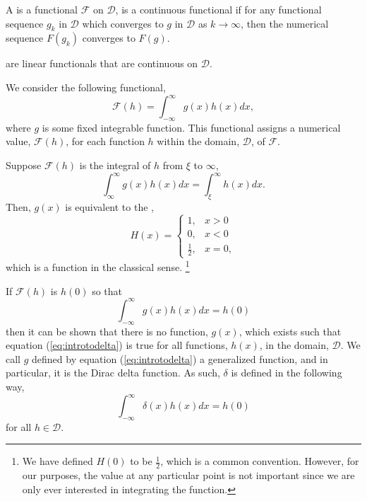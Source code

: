 \begin{definition}
    A  is a functional \(\mathcal{F}\) on \(\mathcal{D}\), is a continuous functional if for any functional sequence \(g_k\) in \(\mathcal{D}\) which converges to \(g\) in \(\mathcal{D}\) as \(k \to \infty\), then the numerical sequence \(F(g_k)\) converges to \(F(g)\).
\end{definition}

\begin{definition}
     are linear functionals that are continuous on \(\mathcal{D}\).
\end{definition}

We consider the following functional,
\begin{equation}\label{eq:generalizedFunction}
    \mathcal{F}(h) = \int_{-\infty}^{\infty} g(x)h(x)dx,
\end{equation}
where \(g\) is some fixed integrable function. This functional assigns a numerical value, \(\mathcal{F}(h)\), for each function \(h\) within the domain, \(\mathcal{D}\), of \(\mathcal{F}\).

\begin{example}
    Suppose \(\mathcal{F}(h)\) is the integral of \(h\) from \(\xi\) to \(\infty\),
    \begin{equation}
        \int_{\infty}^{\infty} g(x)h(x)dx = \int_{\xi}^{\infty} h(x) dx.
    \end{equation}
    Then, \(g(x)\) is equivalent to the ,
    \begin{equation}
        H(x) = \begin{cases}
            1, & x>0\\
            0, & x<0\\
            \frac{1}{2}, & x=0,
        \end{cases}
    \end{equation}
    which is a function in the classical sense. \footnote{We have defined \(H(0)\) to be \(\frac{1}{2}\), which is a common convention. However, for our purposes, the value at any particular point is not important since we are only ever interested in integrating the function.}    
\end{example}

If \(\mathcal{F}(h)\) is \(h(0)\) so that
\begin{equation}\label{eq:introtodelta}
    \int_{-\infty}^{\infty}g(x)h(x) dx=h(0)
\end{equation}
then it can be shown that there is no function, \(g(x)\), which exists such that equation (\ref{eq:introtodelta}) is true for all functions, \(h(x)\), in the domain, \(\mathcal{D}\). We call \(g\) defined by equation (\ref{eq:introtodelta}) a generalized function, and in particular, it is the Dirac delta function. As such, \(\delta\) is defined in the following way,
\begin{equation}\label{eq:deltadef}
    \int_{-\infty}^{\infty} \delta(x)h(x) dx = h(0)
\end{equation}
for all \(h\in \mathcal{D}\).

